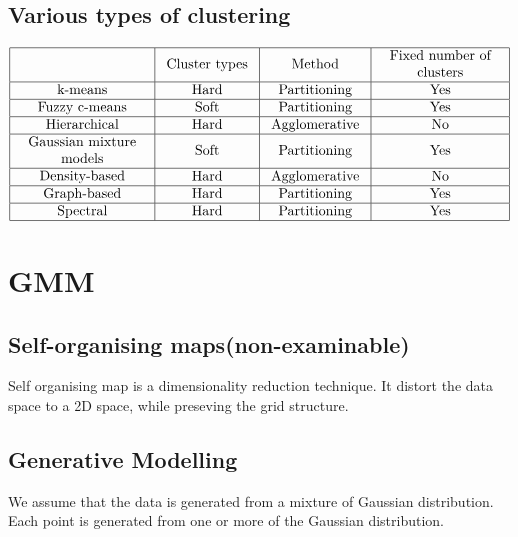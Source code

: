 \documentclass[12pt,a4paper]{article}
\begin{document}
\subsection{Various types of clustering}
\begin{align*}
\begin{array}{|c|c|c|c|}
\hline & \text { Cluster types } & \text { Method } & \begin{array}{c}
\text { Fixed number of } \\
\text { clusters }
\end{array} \\
\hline \text { k-means } & \text { Hard } & \text { Partitioning } & \text { Yes } \\
\hline \text { Fuzzy c-means } & \text { Soft } & \text { Partitioning } & \text { Yes } \\
\hline \text { Hierarchical } & \text { Hard } & \text { Agglomerative } & \text { No } \\
\hline \begin{array}{c}
\text { Gaussian mixture } \\
\text { models }
\end{array} & \text { Soft } & \text { Partitioning } & \text { Yes } \\
\hline \begin{array}{c}
\text { Density-based }
\end{array} & \text { Hard } & \text { Agglomerative } & \text { No } \\
\hline \text { Graph-based } & \text { Hard } & \text { Partitioning } & \text { Yes } \\
\hline \text { Spectral } & \text { Hard } & \text { Partitioning } & \text { Yes } \\
\hline
\end{array}
\end{align*}

\section{GMM}
\subsection{Self-organising maps(non-examinable)}
Self organising map is a dimensionality reduction technique.
It distort the data space to a 2D space, while preseving the grid structure.
\subsection{Generative Modelling}
We assume that the data is generated from a mixture of Gaussian distribution. Each point is generated from one or more of the Gaussian distribution.
\end{document}
